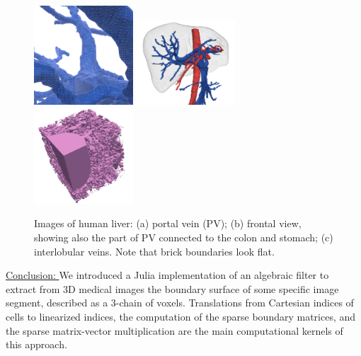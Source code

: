 \documentclass{article}
\begin{document}
\begin{figure}[tbp]
\includegraphics[height=0.3\textwidth,width=0.33\textwidth]{figs/image-1.png}%
\includegraphics[height=0.3\textwidth,width=0.33\textwidth]{figs/image-2.png}%
\includegraphics[height=0.3\textwidth,width=0.33\textwidth]{figs/image-3.png}%
\caption{Images of human liver: (a) portal vein (PV); (b) frontal view, showing also the part of PV connected to the colon and stomach; (c) interlobular veins. Note that brick boundaries look flat.}
\label{fig:schema}
\end{figure}


\vspace{10pt}
\noindent\underline{
Conclusion:
}\vspace{0.2em}\newline 
We introduced a Julia implementation of an algebraic filter to extract from 3D medical images the
boundary surface of some specific image segment, described as a 3-chain of voxels. Translations from
Cartesian indices of cells to linearized indices, the computation of the sparse boundary matrices, and the
sparse matrix-vector multiplication are the main computational kernels of this approach. 
\end{document}
